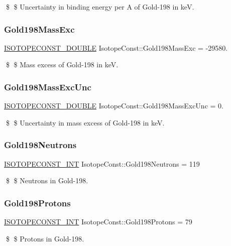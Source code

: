 \$ \$ Uncertainty in binding energy per A of Gold-\/198 in keV. \mbox{\label{group___isotope_const-_gold-_au198_ga2f6c819ee80c10bb7496d5ac90dd4c45}} 
\subsubsection{\texorpdfstring{Gold198\+Mass\+Exc}{Gold198MassExc}}
{\footnotesize\ttfamily \mbox{\hyperlink{group___isotope_const-_macros_ga8f45a7272ce02c0b4c65c44636ed719a}{I\+S\+O\+T\+O\+P\+E\+C\+O\+N\+S\+T\+\_\+\+D\+O\+U\+B\+LE}} Isotope\+Const\+::\+Gold198\+Mass\+Exc = -\/29580.}

\$ \$ Mass excess of Gold-\/198 in keV. \mbox{\label{group___isotope_const-_gold-_au198_ga5e8af106b28537058d67857cc67555ed}} 
\subsubsection{\texorpdfstring{Gold198\+Mass\+Exc\+Unc}{Gold198MassExcUnc}}
{\footnotesize\ttfamily \mbox{\hyperlink{group___isotope_const-_macros_ga8f45a7272ce02c0b4c65c44636ed719a}{I\+S\+O\+T\+O\+P\+E\+C\+O\+N\+S\+T\+\_\+\+D\+O\+U\+B\+LE}} Isotope\+Const\+::\+Gold198\+Mass\+Exc\+Unc = 0.}

\$ \$ Uncertainty in mass excess of Gold-\/198 in keV. \mbox{\label{group___isotope_const-_gold-_au198_ga60de7b2838df380588cb586826dc7e8a}} 
\subsubsection{\texorpdfstring{Gold198\+Neutrons}{Gold198Neutrons}}
{\footnotesize\ttfamily \mbox{\hyperlink{group___isotope_const-_macros_ga5f18360b3e99483a35c32d789e62621c}{I\+S\+O\+T\+O\+P\+E\+C\+O\+N\+S\+T\+\_\+\+I\+NT}} Isotope\+Const\+::\+Gold198\+Neutrons = 119}

\$ \$ Neutrons in Gold-\/198. \mbox{\label{group___isotope_const-_gold-_au198_gae366557ba751f9f2e8c9edd9865998e2}} 
\subsubsection{\texorpdfstring{Gold198\+Protons}{Gold198Protons}}
{\footnotesize\ttfamily \mbox{\hyperlink{group___isotope_const-_macros_ga5f18360b3e99483a35c32d789e62621c}{I\+S\+O\+T\+O\+P\+E\+C\+O\+N\+S\+T\+\_\+\+I\+NT}} Isotope\+Const\+::\+Gold198\+Protons = 79}

\$ \$ Protons in Gold-\/198. 